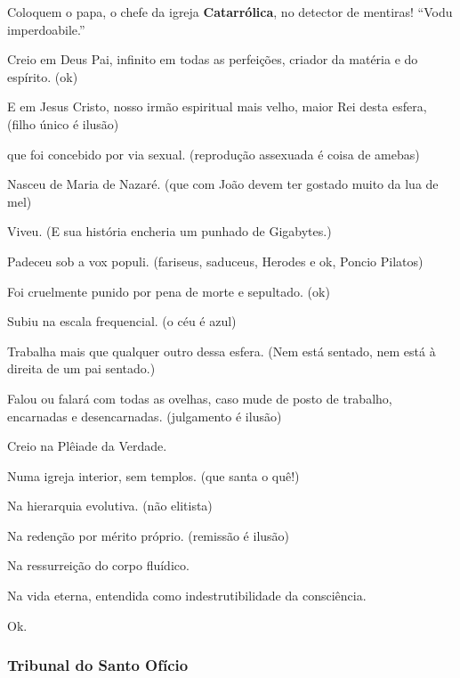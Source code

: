 \documentclass[12pt,a4paper]{article}
\begin{document}
Coloquem o papa, o chefe da igreja \textbf{Catarr\'olica}, no detector de
mentiras! \textquotedblleft Vodu imperdoabile.\textquotedblright

			\begin{flushright}
			\end{flushright}

			Creio em Deus Pai, infinito em todas as perfei\c{c}\~oes, criador da mat\'eria e do esp\'irito. (ok)

			E em Jesus Cristo, nosso irm\~ao espiritual mais velho, maior Rei desta esfera, (filho \'unico \'e ilus\~ao)

			que foi concebido por via sexual. (reprodu\c{c}\~ao assexuada \'e coisa de amebas)

			Nasceu de Maria de Nazar\'e. (que com Jo\~ao devem ter gostado muito da lua de mel)

			Viveu. (E sua hist\'oria encheria um punhado de Gigabytes.)

			Padeceu sob a vox populi. (fariseus, saduceus, Herodes e ok, Poncio Pilatos)

			Foi cruelmente punido por pena de morte e sepultado. (ok)

			Subiu na escala frequencial. (o c\'eu \'e azul)

			Trabalha mais que qualquer outro dessa esfera. (Nem est\'a sentado, nem est\'a \`a direita de um pai sentado.)

			Falou ou falar\'a com todas as ovelhas, caso mude de posto de trabalho, encarnadas e desencarnadas. (julgamento \'e ilus\~ao)

			Creio na Pl\^eiade da Verdade.

			Numa igreja interior, sem templos. (que santa o qu\^e!)

			Na hierarquia evolutiva. (n\~ao elitista)

			Na reden\c{c}\~ao por m\'erito pr\'oprio. (remiss\~ao \'e ilus\~ao)

			Na ressurrei\c{c}\~ao do corpo flu\'idico.

			Na vida eterna, entendida como indestrutibilidade da consci\^encia.

			Ok.

			\subsubsection{Tribunal do Santo Of\'icio}\label{tso}
				\begin{flushright}
				\end{flushright}
\end{document}
